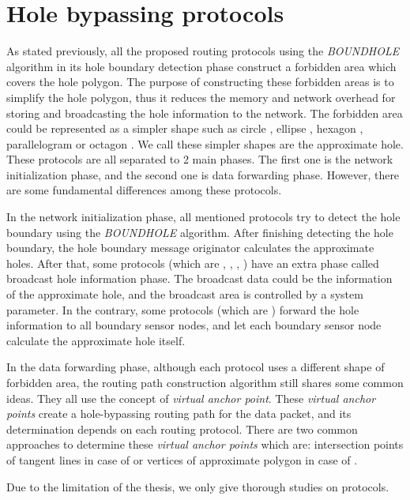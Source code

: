 \section{Hole bypassing protocols}
As stated previously, all the proposed routing protocols using the \emph{BOUNDHOLE} algorithm in its hole boundary detection phase construct a forbidden area which covers the hole polygon. The purpose of constructing these forbidden areas is to simplify the hole polygon, thus it reduces the memory and network overhead for storing and broadcasting the hole information to the network. The forbidden area could be represented as a simpler shape such as circle \cite{ehds}, ellipse \cite{ellipse}, hexagon \cite{hexagon}, parallelogram \cite{elbar} or octagon \cite{issnip}. We call these simpler shapes are the approximate hole. These protocols are all separated to 2 main phases. The first one is the network initialization phase, and the second one is data forwarding phase. However, there are some fundamental differences among these protocols. 

In the network initialization phase, all mentioned protocols try to detect the hole boundary using the \emph{BOUNDHOLE} algorithm. After finishing detecting the hole boundary, the hole boundary message originator calculates the approximate holes. After that, some protocols (which are \cite{ellipse}, \cite{hexagon}, \cite{elbar}, \cite{issnip}) have an extra phase called broadcast hole information phase. The broadcast data could be the information of the approximate hole, and the broadcast area is controlled by a system parameter. In the contrary, some protocols (which are \cite{ehds}) forward the hole information to all boundary sensor nodes, and let each boundary sensor node calculate the approximate hole itself.

In the data forwarding phase, although each protocol uses a different shape of forbidden area, the routing path construction algorithm still shares some common ideas. They all use the concept of \emph{virtual anchor point}. These \emph{virtual anchor points} create a hole-bypassing routing path for the data packet, and its determination depends on each routing protocol. There are two common approaches to determine these \emph{virtual anchor points} which are: intersection points of tangent lines in case of \cite{ehds, ellipse} or vertices of approximate polygon in case of \cite{elbar, issnip, hexagon}. 

Due to the limitation of the thesis, we only give thorough studies on \cite{ehds,issnip,elbar} protocols.

